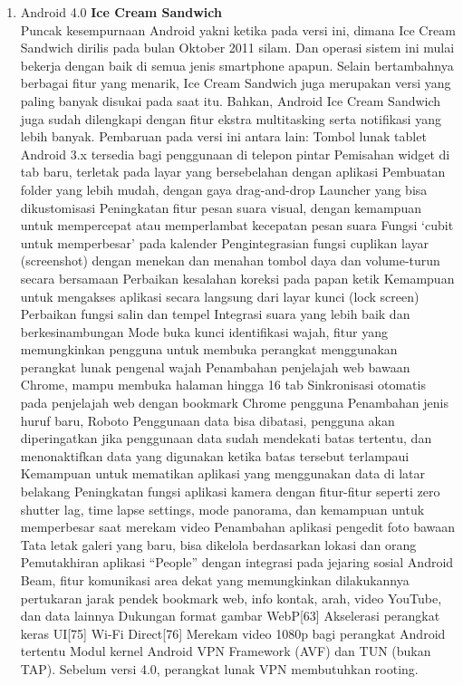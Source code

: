 \begin{enumerate}
\item Android 4.0 \textbf{Ice Cream Sandwich}\\
Puncak kesempurnaan Android yakni ketika pada versi ini, dimana Ice Cream Sandwich dirilis pada bulan Oktober 2011 silam. Dan operasi sistem ini mulai bekerja dengan baik di semua jenis smartphone apapun. Selain bertambahnya berbagai fitur yang menarik, Ice Cream Sandwich juga merupakan versi yang paling banyak disukai pada saat itu. Bahkan, Android Ice Cream Sandwich juga sudah dilengkapi dengan fitur ekstra multitasking serta notifikasi yang lebih banyak. Pembaruan pada versi ini antara lain:
Tombol lunak tablet Android 3.x tersedia bagi penggunaan di telepon pintar
Pemisahan widget di tab baru, terletak pada layar yang bersebelahan dengan aplikasi
Pembuatan folder yang lebih mudah, dengan gaya drag-and-drop
Launcher yang bisa dikustomisasi
Peningkatan fitur pesan suara visual, dengan kemampuan untuk mempercepat atau memperlambat kecepatan pesan suara
Fungsi ‘cubit untuk memperbesar’ pada kalender
Pengintegrasian fungsi cuplikan layar (screenshot) dengan menekan dan menahan tombol daya dan volume-turun secara bersamaan
Perbaikan kesalahan koreksi pada papan ketik
Kemampuan untuk mengakses aplikasi secara langsung dari layar kunci (lock screen)
Perbaikan fungsi salin dan tempel
Integrasi suara yang lebih baik dan berkesinambungan
Mode buka kunci identifikasi wajah, fitur yang memungkinkan pengguna untuk membuka perangkat menggunakan perangkat lunak pengenal wajah
Penambahan penjelajah web bawaan Chrome, mampu membuka halaman hingga 16 tab
Sinkronisasi otomatis pada penjelajah web dengan bookmark Chrome pengguna
Penambahan jenis huruf baru, Roboto
Penggunaan data bisa dibatasi, pengguna akan diperingatkan jika penggunaan data sudah mendekati batas tertentu, dan menonaktifkan data yang digunakan ketika batas tersebut terlampaui
Kemampuan untuk mematikan aplikasi yang menggunakan data di latar belakang
Peningkatan fungsi aplikasi kamera dengan fitur-fitur seperti zero shutter lag, time lapse settings, mode panorama, dan kemampuan untuk memperbesar saat merekam video
Penambahan aplikasi pengedit foto bawaan
Tata letak galeri yang baru, bisa dikelola berdasarkan lokasi dan orang
Pemutakhiran aplikasi “People” dengan integrasi pada jejaring sosial
Android Beam, fitur komunikasi area dekat yang memungkinkan dilakukannya pertukaran jarak pendek bookmark web, info kontak, arah, video YouTube, dan data lainnya
Dukungan format gambar WebP[63]
Akselerasi perangkat keras UI[75]
Wi-Fi Direct[76]
Merekam video 1080p bagi perangkat Android tertentu
Modul kernel Android VPN Framework (AVF) dan TUN (bukan TAP). Sebelum versi 4.0, perangkat lunak VPN membutuhkan rooting.


\end{enumerate}
